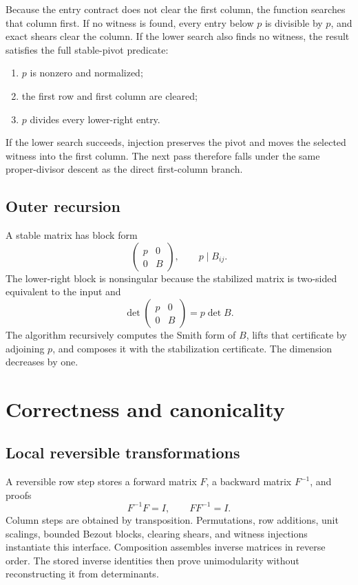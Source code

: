 \documentclass[11pt]{article}
\theoremstyle{definition}
\begin{document}
Because the entry contract does not clear the first column, the function searches that column first.  If no witness is found, every entry below $p$ is divisible by $p$, and exact shears clear the column.  If the lower search also finds no witness, the result satisfies the full stable-pivot predicate:
\begin{enumerate}
  \item $p$ is nonzero and normalized;
  \item the first row and first column are cleared;
  \item $p$ divides every lower-right entry.
\end{enumerate}
If the lower search succeeds, injection preserves the pivot and moves the selected witness into the first column.  The next pass therefore falls under the same proper-divisor descent as the direct first-column branch.

\subsection{Outer recursion}

A stable matrix has block form
\[
  \begin{pmatrix}p&0\\0&B\end{pmatrix},
  \qquad p\mid B_{ij}.
\]
The lower-right block is nonsingular because the stabilized matrix is two-sided equivalent to the input and
\[
  \det\begin{pmatrix}p&0\\0&B\end{pmatrix}=p\det B.
\]
The algorithm recursively computes the Smith form of $B$, lifts that certificate by adjoining $p$, and composes it with the stabilization certificate.  The dimension decreases by one.

\section{Correctness and canonicality}
\label{sec:correctness}

\subsection{Local reversible transformations}

A reversible row step stores a forward matrix $F$, a backward matrix $F^{-1}$, and proofs
\[
  F^{-1}F=I,\qquad FF^{-1}=I.
\]
Column steps are obtained by transposition.  Permutations, row additions, unit scalings, bounded Bezout blocks, clearing shears, and witness injections instantiate this interface.  Composition assembles inverse matrices in reverse order.  The stored inverse identities then prove unimodularity without reconstructing it from determinants.
\end{document}
